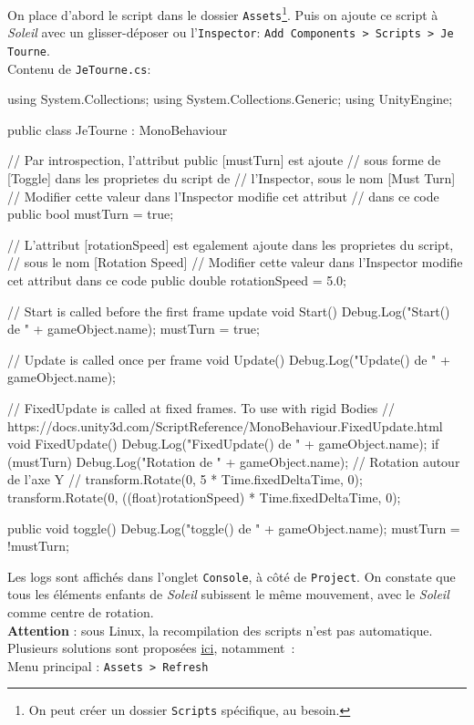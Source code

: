 \documentclass[a4paper,10pt]{article}
\newenvironment{solution}%
{\begin{tcolorbox}[breakable,colback=red!5!white,colframe=red!75!black,title=Solution]}%
{\end{tcolorbox}}
\newenvironment{boxcode}%
{\begin{tcolorbox}[breakable,colback=gray!5!white,colframe=black]}%
	{\end{tcolorbox}}
\begin{document}
\ifversionenseignant
\begin{solution}
	On place d'abord le script dans le dossier \texttt{Assets}\footnote{On peut créer un dossier \texttt{Scripts} spécifique, au besoin.}. Puis on ajoute ce script à \textit{Soleil} avec un glisser-déposer ou l'\texttt{Inspector}: \texttt{Add Components > Scripts > Je Tourne}. \\
	
Contenu de \lstinline|JeTourne.cs|:

\begin{boxcode}
	\begin{csharpsansbord}
using System.Collections;
using System.Collections.Generic;
using UnityEngine;

public class JeTourne : MonoBehaviour
{
	// Par introspection, l'attribut public [mustTurn] est ajoute 
	// sous forme de [Toggle] dans les proprietes du script de
	// l'Inspector, sous le nom [Must Turn]
	// Modifier cette valeur dans l'Inspector modifie cet attribut 
	// dans ce code
	public bool mustTurn = true;
	
	// L'attribut [rotationSpeed] est egalement ajoute dans les proprietes du script,
	// sous le nom [Rotation Speed]
	// Modifier cette valeur dans l'Inspector modifie cet attribut dans ce code
	public double rotationSpeed = 5.0;
		
	
	// Start is called before the first frame update
	void Start()
	{
		Debug.Log("Start() de " + gameObject.name);
		mustTurn = true;
	}
	
	// Update is called once per frame
	void Update()
	{
		Debug.Log("Update() de " + gameObject.name);
	}
	
	// FixedUpdate is called at fixed frames. To use with rigid Bodies
	// https://docs.unity3d.com/ScriptReference/MonoBehaviour.FixedUpdate.html
	void FixedUpdate()
	{
		Debug.Log("FixedUpdate() de " + gameObject.name);
		if (mustTurn)
		{
		    Debug.Log("Rotation de " + gameObject.name);
			// Rotation autour de l'axe Y
			//    transform.Rotate(0, 5 * Time.fixedDeltaTime, 0);
			transform.Rotate(0, ((float)rotationSpeed) * Time.fixedDeltaTime, 0);
		}
	}
	
	public void toggle()
	{
		Debug.Log("toggle() de " + gameObject.name);
		mustTurn = !mustTurn;
	}
}
	\end{csharpsansbord}
\end{boxcode}	


Les logs sont affichés dans l'onglet \texttt{Console}, à côté de \texttt{Project}. On constate que tous les éléments enfants de \textit{Soleil} subissent le même mouvement, avec le \textit{Soleil} comme centre de rotation. \\

\textbf{Attention} : sous Linux, la recompilation des scripts n'est pas automatique. Plusieurs solutions sont proposées \href{https://discussions.unity.com/t/force-unity-to-recompile-scripts/65762/9}{ici}, notamment~:\\
Menu principal : \texttt{Assets > Refresh}

\end{solution}
\fi 
\end{document}
